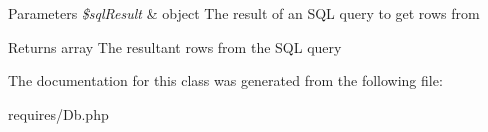\begin{DoxyParams}{Parameters}
{\em \$sql\-Result} & object The result of an S\-Q\-L query to get rows from\\
\hline
\end{DoxyParams}
\begin{DoxyReturn}{Returns}
array The resultant rows from the S\-Q\-L query 
\end{DoxyReturn}


The documentation for this class was generated from the following file\-:\begin{DoxyCompactItemize}
\item 
requires/Db.\-php\end{DoxyCompactItemize}
